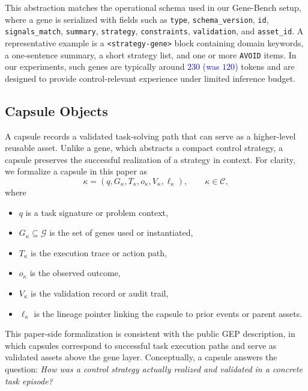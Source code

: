 \documentclass{article}
\newcommand{\blue}[1]{\textcolor{blue}{#1}}
\begin{document}
This abstraction matches the operational schema used in our Gene-Bench setup, where a gene is serialized with fields such as \texttt{type}, \texttt{schema\_version}, \texttt{id}, \texttt{signals\_match}, \texttt{summary}, \texttt{strategy}, \texttt{constraints}, \texttt{validation}, and \texttt{asset\_id}. 
A representative example is a \texttt{<strategy-gene>} block containing domain keywords, a one-sentence summary, a short strategy list, and one or more \texttt{AVOID} items. 
In our experiments, such genes are typically around \blue{$230$ (was $120$)} tokens and are designed to provide control-relevant experience under limited inference budget.

\subsection{Capsule Objects}
\label{app:gep_capsule}

A capsule records a validated task-solving path that can serve as a higher-level reusable asset. 
Unlike a gene, which abstracts a compact control strategy, a capsule preserves the successful realization of a strategy in context. 
For clarity, we formalize a capsule in this paper as
\begin{equation}
\kappa = (q, G_{\kappa}, T_{\kappa}, o_{\kappa}, V_{\kappa}, \ell_{\kappa}),
\qquad \kappa \in \mathcal{C},
\end{equation}
where
\begin{itemize}
    \item $q$ is a task signature or problem context,
    \item $G_{\kappa}\subseteq \mathcal{G}$ is the set of genes used or instantiated,
    \item $T_{\kappa}$ is the execution trace or action path,
    \item $o_{\kappa}$ is the observed outcome,
    \item $V_{\kappa}$ is the validation record or audit trail,
    \item $\ell_{\kappa}$ is the lineage pointer linking the capsule to prior events or parent assets.
\end{itemize}

This paper-side formalization is consistent with the public GEP description, in which capsules correspond to successful task execution paths and serve as validated assets above the gene layer. 
Conceptually, a capsule answers the question: \emph{How was a control strategy actually realized and validated in a concrete task episode?}
\end{document}
